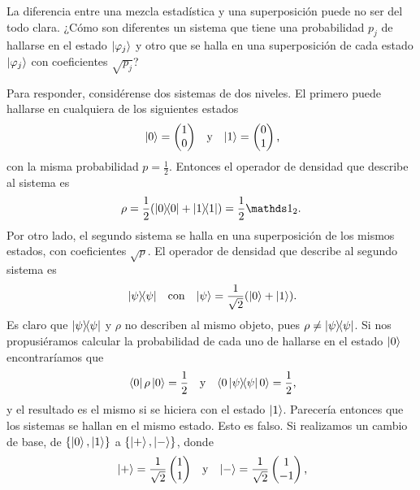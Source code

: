 La diferencia entre una mezcla estadística y una superposición puede no ser del todo clara. ¿Cómo son diferentes un sistema que tiene una probabilidad $p_{j}$ de hallarse en el estado $\ket{\varphi_{j}}$ y otro que se halla en una superposición de cada estado $\ket{\varphi_{j}}$ con coeficientes $\sqrt{p_{j}}$? 

Para responder, considérense dos sistemas de dos niveles. El primero puede hallarse en cualquiera de los siguientes estados
\begin{align}
    \ket{0}=\begin{pmatrix}
        1\\
        0
    \end{pmatrix} && \text{y} && \ket{1}=\begin{pmatrix}
        0\\
        1
    \end{pmatrix}\rlap{,}\nonumber
\end{align}
con la misma probabilidad $p=\frac{1}{2}$. Entonces el operador de densidad que describe al sistema es 
\begin{equation}
    \rho=\frac{1}{2}(\dyad{0}+\dyad{1})=\frac{1}{2}\Id_{2}.\nonumber
\end{equation}
Por otro lado, el segundo sistema se halla en una superposición de los mismos estados, con coeficientes $\sqrt{p}$. El operador de densidad que describe al segundo sistema es 
\begin{align}
    \dyad{\psi} && \text{con} && \ket{\psi}=\frac{1}{\sqrt{2}}(\ket{0}+\ket{1})\rlap{.}\nonumber
\end{align}
Es claro que $\dyad{\psi}$ y $\rho$ no describen al mismo objeto, pues $\rho\neq\dyad{\psi}$. Si nos propusiéramos calcular la probabilidad de cada uno de hallarse en el estado $\ket{0}$ encontraríamos que
\begin{align}
    \bra{0}\rho\ket{0}=\frac{1}{2} && \text{y} &&\langle 0 \dyad{\psi} 0\rangle=\frac{1}{2}\rlap{,}\nonumber
\end{align}
y el resultado es el mismo si se hiciera con el estado $\ket{1}$. Parecería entonces que los sistemas se hallan en el mismo estado. Esto es falso. Si realizamos un cambio de base, de $\{\ket{0},\ket{1}\}$ a $\{\ket{+},\ket{-}\}$, donde
\begin{align}
    \ket{+}=\frac{1}{\sqrt{2}}\begin{pmatrix}
        1\\
        1
    \end{pmatrix} && \text{y} && \ket{-}=\frac{1}{\sqrt{2}}\begin{pmatrix}
        1\\
        -1
    \end{pmatrix}\rlap{,}\nonumber
\end{align}
